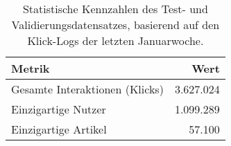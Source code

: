 
\begin{table}[htbp]
    \centering
    \caption{Statistische Kennzahlen des Test- und Validierungsdatensatzes, basierend auf den Klick-Logs der letzten Januarwoche.}
    \label{tab:statistiken_test}
    \begin{tabular}{lr}
        \toprule
        \textbf{Metrik} & \textbf{Wert} \\
        \midrule
        Gesamte Interaktionen (Klicks) & 3.627.024 \\
        Einzigartige Nutzer & 1.099.289 \\
        Einzigartige Artikel & 57.100 \\
        \bottomrule
    \end{tabular}
\end{table}
